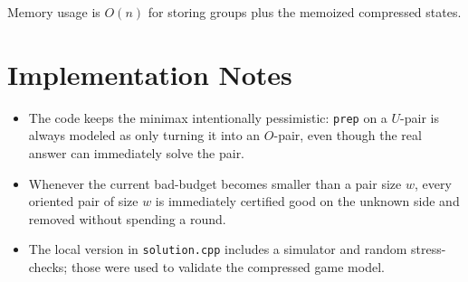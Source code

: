 \documentclass[11pt]{article}
\begin{document}
Memory usage is $O(n)$ for storing groups plus the memoized compressed states.

\section*{Implementation Notes}

\begin{itemize}[leftmargin=*]
    \item The code keeps the minimax intentionally pessimistic: \texttt{prep} on a $U$-pair is always modeled as only turning it into an $O$-pair, even though the real answer can immediately solve the pair.
    \item Whenever the current bad-budget becomes smaller than a pair size $w$, every oriented pair of size $w$ is immediately certified good on the unknown side and removed without spending a round.
    \item The local version in \texttt{solution.cpp} includes a simulator and random stress-checks; those were used to validate the compressed game model.
\end{itemize}
\end{document}
